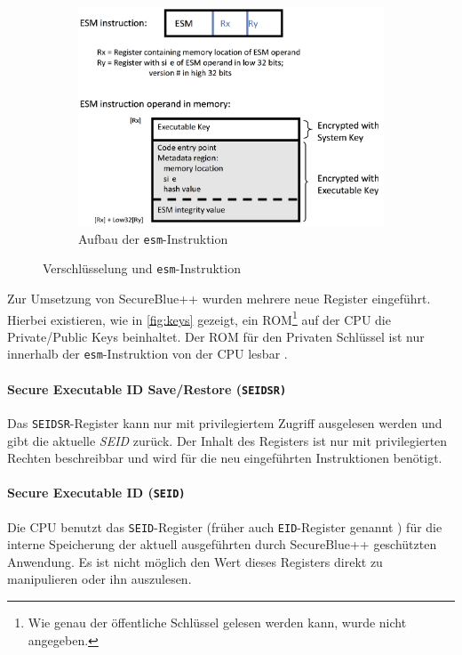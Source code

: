 \documentclass[ngerman]{sig-alternate-05-2015}
\begin{document}
\begin{figure}
\hfill
	~ %
	\begin{subfigure}[b]{0.69\columnwidth}
		\includegraphics[width=\columnwidth]{esm2}
		\caption{Aufbau der \texttt{esm}-Instruktion}
		\label{fig:esm}
	\end{subfigure}
	\caption{Verschlüsselung und \texttt{esm}-Instruktion \cite{boivie2013secureblue++:big}}
\end{figure}
\label{sec:register}
Zur Umsetzung von SecureBlue++ wurden mehrere neue Register eingeführt. Hierbei existieren, wie in \cref{fig:keys} gezeigt, ein ROM\footnote{Wie genau der öffentliche Schlüssel gelesen werden kann, wurde nicht angegeben.} auf der CPU die Private/Public Keys beinhaltet. Der ROM für den Privaten Schlüssel ist nur innerhalb der \texttt{esm}-Instruktion von der CPU lesbar \cite{boivie2013secureblue++:big,secureblue++patent}.

\paragraph{Secure Executable ID Save/Restore (\texttt{SEIDSR)}}
Das \texttt{SEIDSR}-Register kann nur mit privilegiertem Zugriff ausgelesen werden und gibt die aktuelle \emph{SEID} zurück. Der Inhalt des Registers ist nur mit privilegierten Rechten beschreibbar und wird für die neu eingeführten Instruktionen benötigt.

\paragraph{Secure Executable ID (\texttt{SEID)}}
Die CPU benutzt das \texttt{SEID}-Register (früher auch \texttt{EID}-Register genannt \cite{boiviesecureblue++:small,secureblue++patent}) für die interne Speicherung der aktuell ausgeführten durch SecureBlue++ geschützten Anwendung. Es ist nicht möglich den Wert dieses Registers direkt zu manipulieren oder ihn auszulesen.
\end{document}
